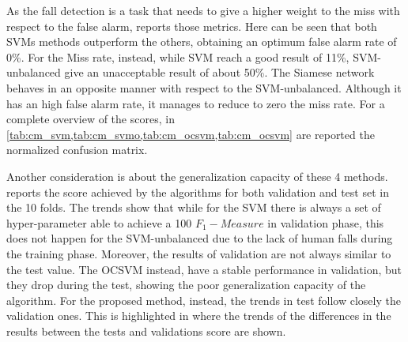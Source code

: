 As the fall detection is a task that needs to give a higher weight to the miss with respect to the false alarm,  reports those metrics. 
Here can be seen that both SVMs methods outperform the others, obtaining an optimum false alarm rate of 0\%. For the Miss rate, instead, while SVM reach a good result of 11\%, SVM-unbalanced give an unacceptable result of about 50\%.
The Siamese network behaves in an opposite manner with respect to the SVM-unbalanced. Although it has an high false alarm rate, it manages to reduce to zero the miss rate.
For a complete overview of the scores, in \cref{tab:cm_svm,tab:cm_svmo,tab:cm_ocsvm,tab:cm_ocsvm} are reported the normalized confusion matrix.

Another consideration is about the generalization capacity of these 4 methods.  reports the score achieved by the algorithms for both validation and test set in the 10 folds. 
The trends show that while for the SVM there is always a set of hyper-parameter able to achieve a 100 $ F_1 -Measure$ in validation phase, this does not happen for the SVM-unbalanced due to the lack of human falls during the training phase. Moreover, the results of validation are not always similar to the test value. The OCSVM instead, have a stable performance in validation, but they drop during the test, showing the poor generalization capacity of the algorithm. 
For the proposed method, instead, the trends in test follow closely the validation ones. This is highlighted in  where the trends of the differences in the results between the tests and validations score are shown.

